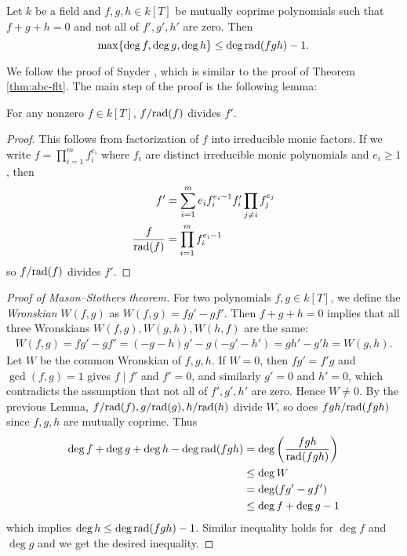 \begin{theorem}
    Let \( k \) be a field and \( f, g, h \in k[T] \) be mutually coprime polynomials such that \( f + g + h = 0 \) and not all of \( f', g', h' \) are zero.
    Then
    \begin{equation}
        \label{eqn:abc-poly}
        \max \{ \deg f, \deg g, \deg h \} \le \deg \mathrm{rad}(f g h) - 1.
    \end{equation}
\end{theorem}

We follow the proof of Snyder \cite{snyder2000alternate}, which is similar to the proof of Theorem \ref{thm:abc-flt}.
The main step of the proof is the following lemma:
\begin{lemma}
    For any nonzero \( f \in k[T] \), \( f / \mathrm{rad}(f) \) divides \( f' \).
\end{lemma}
\begin{proof}
    This follows from factorization of \( f \) into irreducible monic factors.
    If we write \( f = \prod_{i=1}^m f_i^{e_i} \) where \( f_i \) are distinct irreducible monic polynomials and \( e_i \ge 1 \), then
    \begin{align*}
        f' &= \sum_{i=1}^m e_i f_i^{e_i - 1} f_i' \prod_{j \ne i} f_j^{e_j} \\
        \frac{f}{\mathrm{rad}(f)} &= \prod_{i=1}^m f_i^{e_i - 1}
    \end{align*}
    so \( f / \mathrm{rad}(f) \) divides \( f' \).
\end{proof}
\begin{proof}[Proof of Mason--Stothers theorem]
    For two polynomials \( f, g \in k[T] \), we define the \emph{Wronskian} \( W(f, g) \) as \( W(f, g) = f g' - g f' \).
    Then \( f + g + h = 0 \) implies that all three Wronskians \( W(f, g), W(g, h), W(h, f) \) are the same:
    \begin{align*}
        W(f, g) = f g' - g f' = (- g - h) g' - g (-g' -h') = gh' - g'h = W(g, h).
    \end{align*}
    Let $W$ be the common Wronskian of \( f, g, h \).
    If \( W = 0\), then \( fg' = f'g \) and \( \gcd(f, g) = 1 \) gives \( f \mid f' \) and \(f' = 0\), and similarly \( g' = 0 \) and \( h' = 0 \), which contradicts the assumption that not all of \( f', g', h' \) are zero.
    Hence \( W \ne 0 \).
    By the previous Lemma, \( f / \mathrm{rad}(f), g / \mathrm{rad}(g), h / \mathrm{rad}(h) \) divide \( W \), so does \( fgh / \mathrm{rad}(f g h) \) since \( f, g, h \) are mutually coprime.
    Thus
    \begin{align*}
        \deg f + \deg g + \deg h - \deg \mathrm{rad}(fgh) &= \deg \left( \frac{fgh}{\mathrm{rad}(fgh)} \right) \\
        &\le \deg W \\
        &= \deg (f g' - g f') \\
        &\le \deg f + \deg g - 1
    \end{align*}
    which implies \( \deg h \le \deg \mathrm{rad}(f g h) - 1 \).
    Similar inequality holds for \( \deg f \) and \( \deg g \) and we get the desired inequality.
\end{proof}

